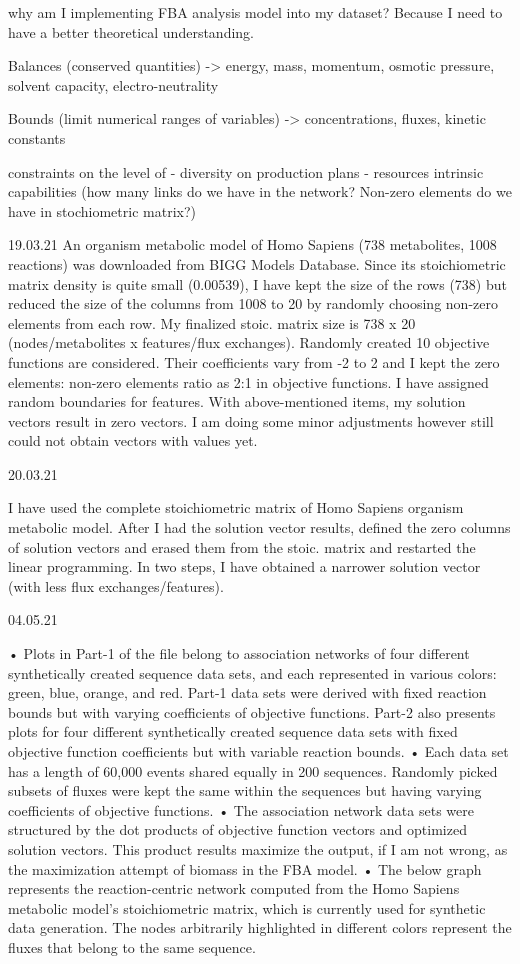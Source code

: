 why am I implementing FBA analysis model into my dataset?
Because I need to have a better theoretical understanding.

Balances (conserved quantities) -> energy, mass, momentum, osmotic pressure, solvent capacity, electro-neutrality

Bounds (limit numerical ranges of variables) -> concentrations, fluxes, kinetic constants

constraints on the level of - diversity on production plans
							- resources
							intrinsic capabilities (how many links do we have in the network? Non-zero elements do we have in stochiometric matrix?)

19.03.21
An organism metabolic model of Homo Sapiens (738 metabolites, 1008 reactions) was downloaded from BIGG Models Database. Since its stoichiometric matrix density is quite small (0.00539), I have kept the size of the rows (738) but reduced the size of the columns from 1008 to 20 by randomly choosing non-zero elements from each row. My finalized stoic. matrix size is 738 x 20 (nodes/metabolites x features/flux exchanges).
Randomly created 10 objective functions are considered. Their coefficients vary from -2 to 2 and I kept the zero elements: non-zero elements ratio as 2:1 in objective functions.
I have assigned random boundaries for features.
With above-mentioned items, my solution vectors result in zero vectors. I am doing some minor adjustments however still could not obtain vectors with values yet.

20.03.21

I have used the complete stoichiometric matrix of Homo Sapiens organism metabolic model. After I had the solution vector results, defined the zero columns of solution vectors and erased them from the stoic. matrix and restarted the linear programming. In two steps, I have obtained a narrower solution vector (with less flux exchanges/features).

04.05.21

•	Plots in Part-1 of the file belong to association networks of four different synthetically created sequence data sets, and each represented in various colors: green, blue, orange, and red. Part-1 data sets were derived with fixed reaction bounds but with varying coefficients of objective functions. Part-2 also presents plots for four different synthetically created sequence data sets with fixed objective function coefficients but with variable reaction bounds.
•	Each data set has a length of 60,000 events shared equally in 200 sequences. Randomly picked subsets of fluxes were kept the same within the sequences but having varying coefficients of objective functions.
•	The association network data sets were structured by the dot products of objective function vectors and optimized solution vectors. This product results maximize the output, if I am not wrong, as the maximization attempt of biomass in the FBA model.
•	The below graph represents the reaction-centric network computed from the Homo Sapiens metabolic model's stoichiometric matrix, which is currently used for synthetic data generation. The nodes arbitrarily highlighted in different colors represent the fluxes that belong to the same sequence.

